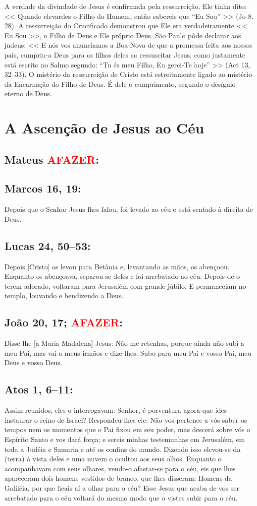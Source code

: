 \documentclass[10pt,a5paper]{book}
\newcommand{\from}[1]{\subsection*{#1}}
\newcommand{\TODO}{\textcolor{red}{\ttfamily AFAZER}}
\begin{document}
A verdade da divindade de Jesus é confirmada pela ressurreição.
Ele tinha dito:
<< Quando elevardes o Filho do Homem, então sabereis que ``Eu Sou'' >> (Jo 8, 28).
A ressurreição do Crucificado demonstrou que Ele era verdadeiramente << Eu Sou >>, o Filho de Deus e Ele próprio Deus.
São Paulo pôde declarar aos judeus:
<< E nós vos anunciamos a Boa-Nova de que a promessa feita aos nossos pais, cumpriu-a Deus para os filhos deles ao ressuscitar Jesus, como justamente está escrito no Salmo segundo:
``Tu és meu Filho, Eu gerei-Te hoje'' >> (Act 13, 32--33).
O mistério da ressurreição de Cristo está estreitamente ligado ao mistério da Encarnação do Filho de Deus.
É dele o cumprimento, segundo o desígnio eterno de Deus.


\section{A Ascenção de Jesus ao Céu}

\from{Mateus \TODO:}

\from{Marcos 16, 19:}

Depois que o Senhor Jesus lhes falou, foi levado ao céu e está sentado à direita de Deus.

\from{Lucas 24, 50--53:}

Depois [Cristo] os levou para Betânia e, levantando as mãos, os abençoou.
Enquanto os abençoava, separou-se deles e foi arrebatado ao céu.
Depois de o terem adorado, voltaram para Jerusalém com grande júbilo.
E permaneciam no templo, louvando e bendizendo a Deus.

\from{João 20, 17; \TODO:}

Disse-lhe [a Maria Madalena] Jesus: Não me retenhas, porque ainda não subi a meu Pai, mas vai a meus irmãos e dize-lhes: Subo para meu Pai e vosso Pai, meu Deus e vosso Deus.

\from{Atos 1, 6--11:}

Assim reunidos, eles o interrogavam:
Senhor, é porventura agora que ides instaurar o reino de Israel?
Respondeu-lhes ele:
Não vos pertence a vós saber os tempos nem os momentos que o Pai fixou em seu poder,
mas descerá sobre vós o Espírito Santo e vos dará força;
e sereis minhas testemunhas em Jerusalém, em toda a Judéia e Samaria e até os confins do mundo.
Dizendo isso elevou-se da (terra) à vista deles e uma nuvem o ocultou aos seus olhos.
Enquanto o acompanhavam com seus olhares, vendo-o afastar-se para o céu, eis que lhes apareceram dois homens vestidos de branco, que lhes disseram:
Homens da Galiléia, por que ficais aí a olhar para o céu? Esse Jesus que acaba de vos ser arrebatado para o céu voltará do mesmo modo que o vistes subir para o céu.
\end{document}
